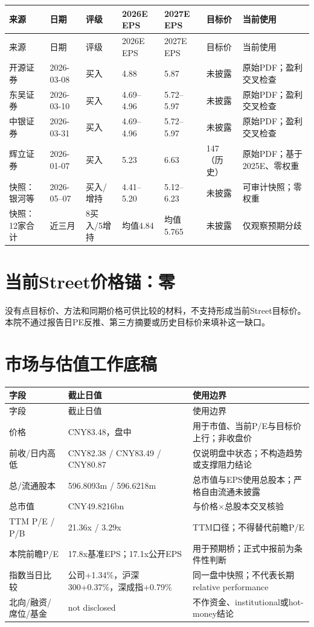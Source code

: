 \begin{longtable}{L{2.0cm}L{1.6cm}L{1.5cm}L{1.6cm}L{1.6cm}L{1.8cm}L{2.4cm}}
\toprule
来源 & 日期 & 评级 & 2026E EPS & 2027E EPS & 目标价 & 当前使用 \\
\midrule
\endfirsthead
\toprule
来源 & 日期 & 评级 & 2026E EPS & 2027E EPS & 目标价 & 当前使用 \\
\midrule
\endhead
开源证券 & 2026-03-08 & 买入 & 4.88 & 5.87 & 未披露 & 原始PDF；盈利交叉检查 \\
东吴证券 & 2026-03-10 & 买入 & 4.69--4.96 & 5.72--5.97 & 未披露 & 原始PDF；盈利交叉检查 \\
中银证券 & 2026-03-31 & 买入 & 4.69--4.96 & 5.72--5.97 & 未披露 & 原始PDF；盈利交叉检查 \\
辉立证券 & 2026-01-07 & 买入 & 5.23 & 6.63 & 147（历史） & 原始PDF；基于2025E、零权重 \\
快照：银河等 & 2026-05--07 & 买入/增持 & 4.41--5.20 & 5.12--6.23 & 未披露 & 可审计快照；零权重 \\
快照：12家合计 & 近三月 & 8买入/5增持 & 均值4.84 & 均值5.765 & 未披露 & 仅观察预期分歧 \\
\bottomrule
\end{longtable}

\section{当前Street价格锚：零}

没有点目标价、方法和同期价格可供比较的材料，不支持形成当前Street目标价。本院不通过报告日PE反推、第三方摘要或历史目标价来填补这一缺口。

\section{市场与估值工作底稿}

\begin{longtable}{L{3.2cm}L{3.1cm}L{6.2cm}}
\toprule
字段 & 截止日值 & 使用边界 \\
\midrule
\endfirsthead
\toprule
字段 & 截止日值 & 使用边界 \\
\midrule
\endhead
价格 & CNY83.48，盘中 & 用于市值、当前P/E与目标价上行；非收盘价 \\
前收/日内高低 & CNY82.38 / CNY83.49 / CNY80.87 & 仅说明盘中状态；不构造趋势或支撑阻力结论 \\
总/流通股本 & 596.8093m / 596.6218m & 总市值与EPS使用总股本；严格自由流通未披露 \\
总市值 & CNY49.8216bn & 与价格$\times$总股本交叉核验 \\
TTM P/E / P/B & 21.36x / 3.29x & TTM口径；不得替代前瞻P/E \\
本院前瞻P/E & 17.8x基准EPS；17.1x公开EPS & 用于预期桥；正式中报前为条件性判断 \\
指数当日比较 & 公司+1.34\%，沪深300+0.37\%，深成指+0.79\% & 同一盘中快照；不代表长期relative performance \\
北向/融资/席位/基金 & not disclosed & 不作资金、institutional或hot-money结论 \\
\bottomrule
\end{longtable}

